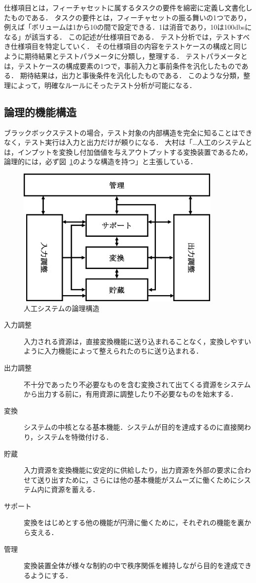 仕様項目とは，フィーチャセットに属するタスクの要件を綿密に定義し文書化したものである．
タスクの要件とは，フィーチャセットの振る舞いの1つであり，例えば「ボリュームは1から10の間で設定できる．1は消音であり，10は100dbsになる」が該当する．
この記述が仕様項目である．
テスト分析では，テストすべき仕様項目を特定していく．
その仕様項目の内容をテストケースの構成と同じように期待結果とテストパラメータに分類し，整理する．
テストパラメータとは，テストケースの構成要素の1つで，事前入力と事前条件を汎化したものである．
期待結果は，出力と事後条件を汎化したものである．
このような分類，整理によって，明確なルールにそったテスト分析が可能になる．

\subsection{論理的機能構造}
ブラックボックステストの場合，テスト対象の内部構造を完全に知ることはできなく，テスト実行は入力と出力だけが頼りになる．
大村は「…人工のシステムとは，インプットを変換し付加価値を与えアウトプットする変換装置であるため，論理的には，必ず図~\ref{fig:D-2-FigLSOF1}のような構造を持つ\cite{LSOF}」と主張している．
\begin{figure}[htbp]
  \begin{center}
	\includegraphics[width=10cm]{./image/D-2-FigLSOF.png}
	\caption{人工システムの論理構造}
	\label{fig:D-2-FigLSOF1}
  \end{center}
\end{figure}

\begin{description}
  \item[入力調整]入力される資源は，直接変換機能に送り込まれることなく，変換しやすいように入力機能によって整えられたのちに送り込まれる．
  \item[出力調整]不十分であったり不必要なものを含む変換されて出てくる資源をシステムから出力する前に，有用資源に調整したり不必要なものを始末する．
  \item[変換]システムの中核となる基本機能．システムが目的を達成するのに直接関わり，システムを特徴付ける．
  \item[貯蔵]入力資源を変換機能に安定的に供給したり，出力資源を外部の要求に合わせて送り出すために，さらには他の基本機能がスムーズに働くためにシステム内に資源を蓄える．
  \item[サポート]変換をはじめとする他の機能が円滑に働くために，それぞれの機能を裏から支える．
  \item[管理]変換装置全体が様々な制約の中で秩序関係を維持しながら目的を達成できるようにする．
\end{description}


